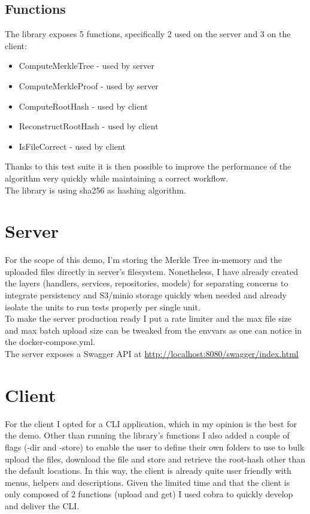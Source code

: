 \documentclass[11pt]{article}
\begin{document}
\subsection{Functions}
\label{sec:orgad6b517}
The library exposes 5 functions, specifically 2 used on the server and 3 on the client:
\begin{itemize}
\item ComputeMerkleTree - used by server
\item ComputeMerkleProof - used by server
\item ComputeRootHash - used by client
\item ReconstructRootHash - used by client
\item IsFileCorrect - used by client
\end{itemize}
Thanks to this test suite it is then possible to improve the performance of the algorithm very quickly while maintaining a correct workflow.\\[0pt]
The library is using sha256 as hashing algorithm.
\section{Server}
\label{sec:org3f97879}
For the scope of this demo, I'm storing the Merkle Tree in-memory and the uploaded files directly in server's filesystem. Nonetheless, I have already created the layers (handlers, services, repositories, models) for separating concerns to integrate persistency and S3/minio storage quickly when needed and already isolate the units to run tests properly per single unit.\\[0pt]
To make the server production ready I put a rate limiter and the max file size and max batch upload size can be tweaked from the envvars as one can notice in the docker-compose.yml.\\[0pt]
The server exposes a Swagger API at \url{http://localhost:8080/swagger/index.html}
\section{Client}
\label{sec:org473b2a4}
For the client I opted for a CLI application, which in my opinion is the best for the demo. Other than running the library's functions I also added a couple of flags (-dir and -store) to enable the user to define their own folders to use to bulk upload the files, download the file and store and retrieve the root-hash other than the default locations. In this way, the client is already quite user friendly with menus, helpers and descriptions. Given the limited time and that the client is only composed of 2 functions (upload and get) I used cobra to quickly develop and deliver the CLI.
\end{document}
